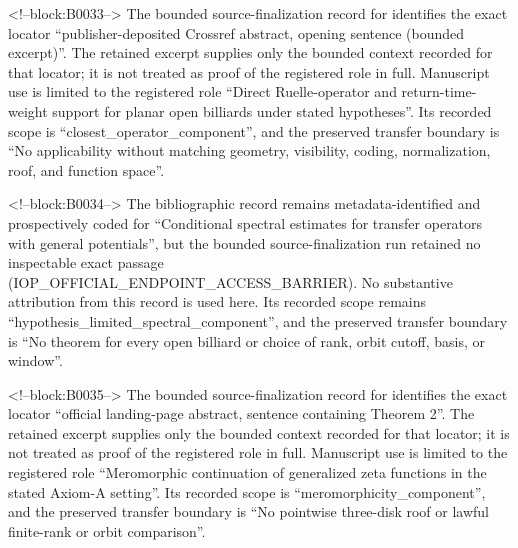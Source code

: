 \documentclass[11pt,a4paper]{article}
\begin{document}
<!--block:B0033-->
The bounded source-finalization record for \citep{P30-S11} identifies
the exact locator ``publisher-deposited Crossref abstract, opening sentence (bounded excerpt)''.  The retained excerpt supplies only the
bounded context recorded for that locator; it is not treated as proof of the
registered role in full.  Manuscript use is limited to the registered role ``Direct Ruelle-operator and return-time-weight support for planar open billiards under stated hypotheses''.
Its recorded scope is ``closest\_operator\_component'', and the preserved
transfer boundary is ``No applicability without matching geometry, visibility, coding, normalization, roof, and function space''.

<!--block:B0034-->
The bibliographic record \citep{P30-S12} remains metadata-identified and
prospectively coded for ``Conditional spectral estimates for transfer operators with general potentials'', but the bounded source-finalization
run retained no inspectable exact passage (IOP\_OFFICIAL\_ENDPOINT\_ACCESS\_BARRIER).  No substantive
attribution from this record is used here.  Its recorded scope remains
``hypothesis\_limited\_spectral\_component'', and the preserved transfer boundary is ``No theorem for every open billiard or choice of rank, orbit cutoff, basis, or window''.

<!--block:B0035-->
The bounded source-finalization record for \citep{P30-S15} identifies
the exact locator ``official landing-page abstract, sentence containing Theorem 2''.  The retained excerpt supplies only the
bounded context recorded for that locator; it is not treated as proof of the
registered role in full.  Manuscript use is limited to the registered role ``Meromorphic continuation of generalized zeta functions in the stated Axiom-A setting''.
Its recorded scope is ``meromorphicity\_component'', and the preserved
transfer boundary is ``No pointwise three-disk roof or lawful finite-rank or orbit comparison''.
\end{document}
